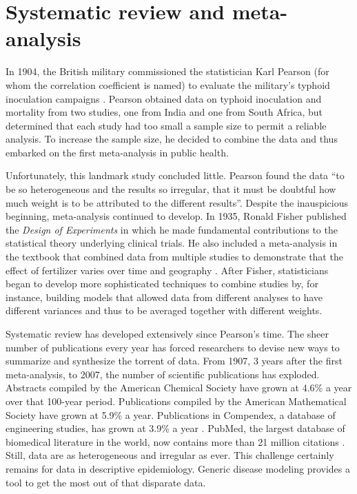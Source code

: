 \section{Systematic review and meta-analysis}
In 1904, the British military commissioned the statistician Karl
Pearson (for whom the correlation coefficient is named) to evaluate
the military's typhoid inoculation campaigns
\cite{Pearson_Report_1904}. Pearson obtained data on typhoid
inoculation and mortality from two studies, one from India and one
from South Africa, but determined that each study had too small a
sample size to permit a reliable analysis. To increase the sample
size, he decided to combine the data and thus embarked on the first
meta-analysis in public health.

Unfortunately, this landmark study concluded little. Pearson found the
data ``to be so heterogeneous and the results so irregular, that it
must be doubtful how much weight is to be attributed to the different
results''. Despite the inauspicious beginning, meta-analysis continued
to develop. In 1935, Ronald Fisher published the \emph{Design of
  Experiments} in which he made fundamental contributions to the
statistical theory underlying clinical trials. He also included a
meta-analysis in the textbook that combined data from multiple studies
to demonstrate that the effect of fertilizer varies over time and
geography \cite{O'Rourke_An_2007}. After Fisher, statisticians began
to develop more sophisticated techniques to combine studies by, for
instance, building models that allowed data from different analyses to
have different variances and thus to be averaged together with
different weights.

Systematic review has developed extensively since Pearson's time. The
sheer number of publications every year has forced researchers to
devise new ways to summarize and synthesize the torrent of data. From
1907, 3 years after the first meta-analysis, to 2007, the number of
scientific publications has exploded. Abstracts compiled by the
American Chemical Society have grown at 4.6\% a year over that
100-year period. Publications compiled by the American Mathematical
Society have grown at 5.9\% a year.  Publications in Compendex, a
database of engineering studies, has grown at 3.9\% a year
\cite{Larsen_Rate_2010}. PubMed, the largest database of biomedical
literature in the world, now contains more than 21 million citations
\cite{US_PubMed_2012}. Still, data are as heterogeneous and irregular
as ever. This challenge certainly remains for data in descriptive
epidemiology. Generic disease modeling provides a tool to get the most
out of that disparate data.

